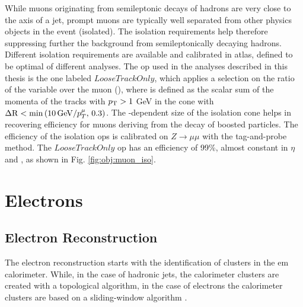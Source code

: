 While muons originating from semileptonic decays of hadrons are very close to the axis of a jet, prompt muons are typically well separated from other physics objects in the event (isolated). The isolation requirements help therefore suppressing further the background from semileptonically decaying hadrons. Different isolation requirements are available and calibrated in \gls{atlas}, defined to be optimal of different analyses. 
The \gls{op} used in the analyses described in this thesis is the one labeled $LooseTrackOnly$, which applies a selection on the ratio of the 
variable \ptvar over the muon \pt (\ptmu), where \ptvar is defined as the scalar sum of the momenta of the tracks with $p_{\rm T}>1$ GeV in the cone with 
$\Delta\mathrm{R} < \min \left(  10 \, \mathrm{GeV}/p_T^\mu , \, 0.3\right) $. The \pt-dependent size of the isolation cone helps in recovering efficiency for muons deriving from the decay of boosted particles. The efficiency of the isolation \glspl{op} is calibrated on $Z\rightarrow \mu \mu$ with the tag-and-probe method. The $LooseTrackOnly$ \gls{op} has an efficiency of 99\%, almost constant in $\eta$ and \pt, as shown in Fig. \ref{fig:obj:muon_iso}. 


\section{Electrons}

\subsection{Electron Reconstruction}

The electron reconstruction \cite{ATLAS:2011lah,ATLAS:2016iqc} starts with the identification of clusters in the \gls{em} calorimeter.
While, in the case of hadronic jets, the calorimeter clusters are created with a topological algorithm, in the case of electrons the calorimeter clusters are based on a sliding-window algorithm \cite{Lampl:2008zz}.

